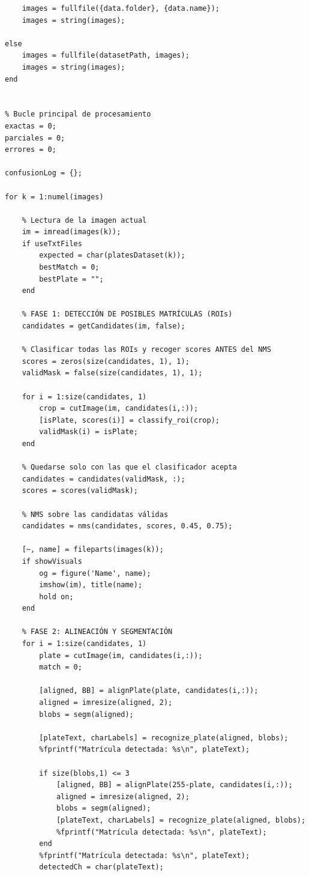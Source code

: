 \begin{verbatim}
    images = fullfile({data.folder}, {data.name});
    images = string(images);

else 
    images = fullfile(datasetPath, images);
    images = string(images);
end


% Bucle principal de procesamiento
exactas = 0;
parciales = 0;
errores = 0;

confusionLog = {};

for k = 1:numel(images)

    % Lectura de la imagen actual
    im = imread(images(k));
    if useTxtFiles
        expected = char(platesDataset(k));
        bestMatch = 0;
        bestPlate = "";
    end

    % FASE 1: DETECCIÓN DE POSIBLES MATRÍCULAS (ROIs)
    candidates = getCandidates(im, false);
    
    % Clasificar todas las ROIs y recoger scores ANTES del NMS
    scores = zeros(size(candidates, 1), 1);
    validMask = false(size(candidates, 1), 1);
    
    for i = 1:size(candidates, 1)
        crop = cutImage(im, candidates(i,:));
        [isPlate, scores(i)] = classify_roi(crop);
        validMask(i) = isPlate;
    end
    
    % Quedarse solo con las que el clasificador acepta
    candidates = candidates(validMask, :);
    scores = scores(validMask);
    
    % NMS sobre las candidatas válidas
    candidates = nms(candidates, scores, 0.45, 0.75);
    
    [~, name] = fileparts(images(k));
    if showVisuals
        og = figure('Name', name);
        imshow(im), title(name);
        hold on;
    end
    
    % FASE 2: ALINEACIÓN Y SEGMENTACIÓN
    for i = 1:size(candidates, 1)
        plate = cutImage(im, candidates(i,:));
        match = 0;
    
        [aligned, BB] = alignPlate(plate, candidates(i,:));
        aligned = imresize(aligned, 2);
        blobs = segm(aligned);

        [plateText, charLabels] = recognize_plate(aligned, blobs);
        %fprintf("Matrícula detectada: %s\n", plateText);

        if size(blobs,1) <= 3
            [aligned, BB] = alignPlate(255-plate, candidates(i,:));
            aligned = imresize(aligned, 2);
            blobs = segm(aligned);
            [plateText, charLabels] = recognize_plate(aligned, blobs);
            %fprintf("Matrícula detectada: %s\n", plateText);
        end
        %fprintf("Matrícula detectada: %s\n", plateText);
        detectedCh = char(plateText);


\end{verbatim}
